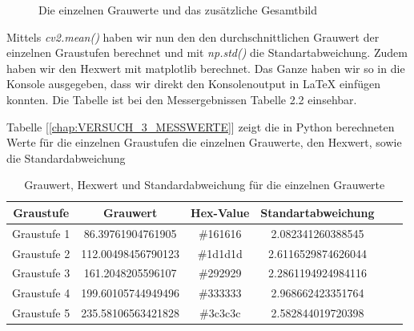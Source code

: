 \documentclass[12pt, oneside, a4paper, \docLanguage]{report}
\begin{document}
\begin{figure}[hbt!]
		\hfill
	\caption{Die einzelnen Grauwerte und das zusätzliche Gesamtbild}
\end{figure}
\newpage
Mittels \textit{cv2.mean()} haben wir nun den den durchschnittlichen Grauwert der einzelnen Graustufen berechnet und mit \textit{np.std()} die Standartabweichung.
Zudem haben wir den Hexwert mit matplotlib berechnet. Das Ganze haben wir so in die Konsole ausgegeben, dass wir direkt den Konsolenoutput in LaTeX einfügen konnten.
Die Tabelle ist bei den Messergebnissen Tabelle 2.2 einsehbar.

Tabelle [\ref{chap:VERSUCH_3_MESSWERTE}] zeigt die in Python berechneten Werte für die einzelnen Graustufen die einzelnen Grauwerte, den Hexwert, sowie die Standardabweichung 

\begin{table}[H]
	\centering\small
	\begin{tabular}{|c|c|c|c|c|c|}
		\hline
		Graustufe & Grauwert & Hex-Value & Standartabweichung \\
		\hline
		Graustufe 1 & 86.39761904761905 &  \#161616 & 2.082341260388545 \\
		\hline
		Graustufe 2 & 112.00498456790123 &  \#1d1d1d & 2.6116529874626044 \\
		\hline
		Graustufe 3 & 161.2048205596107 &  \#292929 & 2.2861194924984116 \\
		\hline
		Graustufe 4 & 199.60105744949496 &  \#333333 & 2.968662423351764 \\
		\hline
		Graustufe 5 & 235.58106563421828 &  \#3c3c3c & 2.582844019720398 \\
		\hline
	\end{tabular}
	\caption{Grauwert, Hexwert und Standardabweichung für die einzelnen Grauwerte}
	\label{fig:VERSUCH_3_MESSWERTE}
\end{table}
\end{document}
